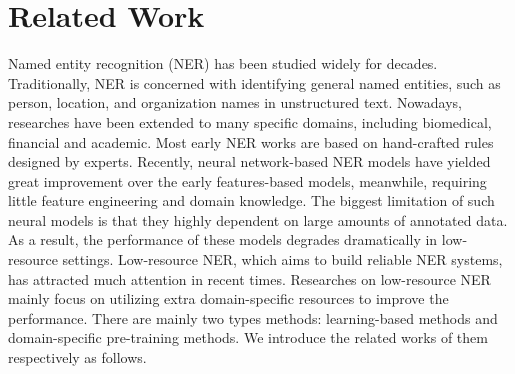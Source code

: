 \documentclass[10pt, conference, compsocconf]{IEEEtran}
\begin{document}


    
  

\section{Related Work}

Named entity recognition (NER) has been studied widely for decades. 
Traditionally, NER is concerned with identifying general named entities, such as person, location, and organization names 
in unstructured text. Nowadays, researches have been extended to many specific domains, including biomedical, financial
and academic. Most early NER works are based on hand-crafted rules designed by experts\cite{collobert2011natural,yang2012extracting,luo2015joint}. 
Recently, neural network-based NER models\cite{ma-hovy-2016-end,lample-etal-2016-neural,liu2018empower} have yielded great improvement over the early features-based models, 
meanwhile, requiring little feature engineering and domain knowledge\cite{yang2012extracting,ma-hovy-2016-end}. 
The biggest limitation of such neural models is that they
highly dependent on large amounts of annotated data. As a result, 
the performance of these models degrades dramatically in low-resource settings.
Low-resource NER, which aims to build reliable NER systems, has attracted much attention in recent times.
Researches on low-resource NER
mainly focus on utilizing extra domain-specific resources to improve the performance.
There are mainly two types methods: learning-based methods and domain-specific pre-training methods. 
We introduce the related works of them respectively as follows.
\end{document}
